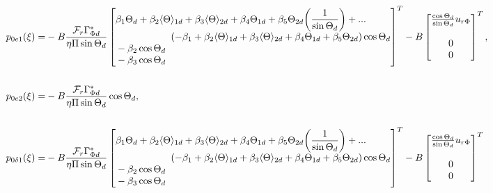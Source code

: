 \documentclass[main.tex]{subfiles}
\begin{document}
	\begin{align}
		p_{0e1}(\xi) =& -B\frac{\mathcal{F}_r \Gamma_{\Phi d}^*}{\eta \Pi \sin \Theta_d} \begin{bmatrix} \begin{aligned}
		&\beta_1 \Theta_d  + \beta_2 \langle \Theta \rangle_{1d}  + \beta_3 \langle \Theta \rangle_{2d} + \beta_4 \Theta_{1d} + \beta_5 \Theta_{2d} \bigg(\frac{1}{\sin \Theta_d}\bigg) +...\\ 
		 &\kern2cm (-\beta_1 + \beta_2 \langle \Theta \rangle_{1d}  + \beta_3 \langle \Theta \rangle_{2d} + \beta_4 \Theta_{1d} + \beta_5 \Theta_{2d})\cos \Theta_d \\
		&-\beta_2 \cos \Theta_d \\
		&-\beta_3 \cos \Theta_d\end{aligned}\end{bmatrix}^T  - B\begin{bmatrix}\frac{\cos \Theta_d}{\sin \Theta_d}u_{r\Phi} \\\\0 \\0 \end{bmatrix}^T, \nonumber \\
		\nonumber\\
		p_{0e2}(\xi) =& -B\frac{\mathcal{F}_r \Gamma_{\Phi d}^*}{\eta \Pi \sin \Theta_d}\cos \Theta_d, \nonumber \\
		\nonumber \\
		p_{0\delta 1}(\xi)  =&  -B\frac{\mathcal{F}_r \Gamma_{\Phi d}^*}{\eta \Pi \sin \Theta_d} \begin{bmatrix} \begin{aligned}
		&\beta_1 \Theta_d  + \beta_2 \langle \Theta \rangle_{1d}  + \beta_3 \langle \Theta \rangle_{2d} + \beta_4 \Theta_{1d} + \beta_5 \Theta_{2d} \bigg(\frac{1}{\sin \Theta_d}\bigg) +...\\ 
		&\kern2cm (-\beta_1 + \beta_2 \langle \Theta \rangle_{1d}  + \beta_3 \langle \Theta \rangle_{2d} + \beta_4 \Theta_{1d} + \beta_5 \Theta_{2d})\cos \Theta_d \\
		&-\beta_2 \cos \Theta_d \\
		&-\beta_3 \cos \Theta_d\end{aligned}\end{bmatrix}^T	- B\begin{bmatrix}\frac{\cos \Theta_d}{\sin \Theta_d}u_{r\Phi} \\\\0\\0 \end{bmatrix}^T	\nonumber \\

\end{align}
\end{document}
